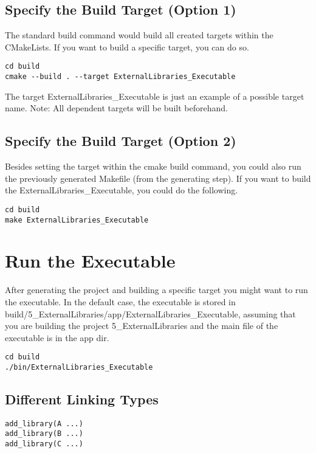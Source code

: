 \subsection{Specify the Build Target (Option 1)}

The standard build command would build all created targets within the CMakeLists.
If you want to build a specific target, you can do so.

\begin{verbatim}
cd build
cmake --build . --target ExternalLibraries_Executable
\end{verbatim}

The target ExternalLibraries\_Executable is just an example of a possible target name.
Note: All dependent targets will be built beforehand.

\subsection{Specify the Build Target (Option 2)}


Besides setting the target within the cmake build command, you could also run the previously generated Makefile (from the generating step).
If you want to build the ExternalLibraries\_Executable, you could do the following.

\begin{verbatim}
cd build
make ExternalLibraries_Executable
\end{verbatim}


\section{Run the Executable}

After generating the project and building a specific target you might want to run the executable.
In the default case, the executable is stored in build/5\_ExternalLibraries/app/ExternalLibraries\_Executable, assuming that you are building the project 5\_ExternalLibraries and the main file of the executable is in the app dir.

\begin{verbatim}
cd build
./bin/ExternalLibraries_Executable
\end{verbatim}


\subsection{Different Linking Types}

\begin{verbatim}
add_library(A ...)
add_library(B ...)
add_library(C ...)
\end{verbatim}

